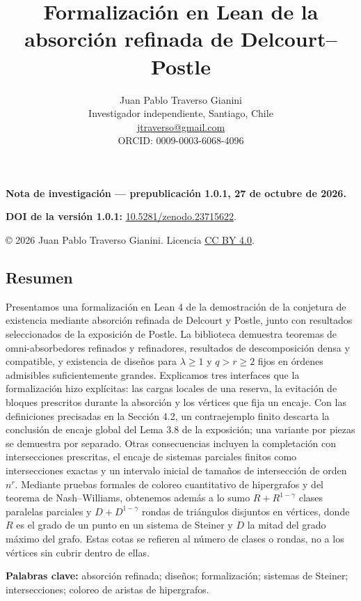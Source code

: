 \documentclass[spanish,11pt,a4paper]{article}
\title{Formalización en Lean de la absorción refinada de Delcourt–Postle}
\author{Juan Pablo Traverso Gianini\\
\small Investigador independiente, Santiago, Chile\\
\small \href{mailto:jtraverso@gmail.com}{jtraverso@gmail.com}\\
\small ORCID: 0009-0003-6068-4096}
\date{}
\begin{document}
\raggedbottom
{}
\makeatletter
{}
\makeatother
\maketitle
\textbf{Nota de investigación --- prepublicación 1.0.1, 27 de octubre de 2026.}

\textbf{DOI de la versión 1.0.1:} \href{https://doi.org/10.5281/zenodo.23715622}{10.5281/zenodo.23715622}.

© 2026 Juan Pablo Traverso Gianini. Licencia \href{https://creativecommons.org/licenses/by/4.0/}{CC BY 4.0}.

\subsection{Resumen}\label{resumen}

Presentamos una formalización en Lean 4 de la demostración de la conjetura de existencia mediante absorción refinada de Delcourt y Postle, junto con resultados seleccionados de la exposición de Postle. La biblioteca demuestra teoremas de omni-absorbedores refinados y refinadores, resultados de descomposición densa y compatible, y existencia de diseños para \(\lambda\ge1\) y \(q>r\ge2\) fijos en órdenes admisibles suficientemente grandes. Explicamos tres interfaces que la formalización hizo explícitas: las cargas locales de una reserva, la evitación de bloques prescritos durante la absorción y los vértices que fija un encaje. Con las definiciones precisadas en la Sección 4.2, un contraejemplo finito descarta la conclusión de encaje global del Lema 3.8 de la exposición; una variante por piezas se demuestra por separado. Otras consecuencias incluyen la completación con intersecciones prescritas, el encaje de sistemas parciales finitos como intersecciones exactas y un intervalo inicial de tamaños de intersección de orden \(n^r\). Mediante pruebas formales de coloreo cuantitativo de hipergrafos y del teorema de Nash--Williams, obtenemos además a lo sumo \(R+R^{1-\gamma}\) clases paralelas parciales y \(D+D^{1-\gamma}\) rondas de triángulos disjuntos en vértices, donde \(R\) es el grado de un punto en un sistema de Steiner y \(D\) la mitad del grado máximo del grafo. Estas cotas se refieren al número de clases o rondas, no a los vértices sin cubrir dentro de ellas.

\textbf{Palabras clave:} absorción refinada; diseños; formalización; sistemas de Steiner; intersecciones; coloreo de aristas de hipergrafos.
\end{document}

